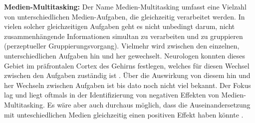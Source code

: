 \textbf{Medien-Multitasking:} Der Name Medien-Multitasking umfasst eine Vielzahl von unterschiedlichen Medien-Aufgaben, die gleichzeitig verarbeitet werden. In vielen solcher gleichzeitigen Aufgaben geht es nicht unbedingt darum, nicht zusammenhängende Informationen simultan zu verarbeiten und zu gruppieren (perzeptueller Gruppierungsvorgang). Vielmehr wird zwischen den einzelnen, unterschiedlichen Aufgaben hin und her gewechselt. Neurologen konnten dieses Gebiet im präfrontalen Cortex des Gehirns festlegen, welches für diesen Wechsel zwischen den Aufgaben zuständig ist \cite{Wallis2006, Wood2003}. Über die Auswirkung von diesem hin und her Wechseln zwischen Aufgaben ist bis dato noch nicht viel bekannt. Der Fokus lag und liegt oftmals in der Identifizierung von negativen Effekten von Medien-Multitasking. Es wäre aber auch durchaus möglich, dass die Auseinandersetzung mit unteschiedlichen Medien gleichzeitig einen positiven Effekt haben könnte \cite{Foehr2006}.   

